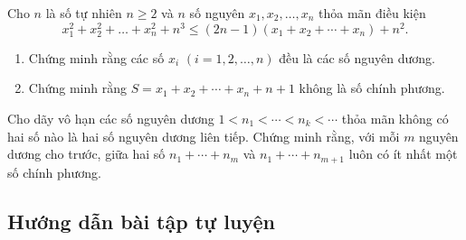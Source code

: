 \begin{btt}
Cho $n$ là số tự nhiên $n \geq 2$ và $n$ số nguyên $x_{1}, x_{2}, \ldots, x_{n}$ thỏa mãn điều kiện $$x_{1}^{2}+x_{2}^{2}+\ldots+x_{n}^{2}+n^{3} \leq(2 n-1)\left(x_{1}+x_{2}+\cdots+x_{n}\right)+n^{2} .$$
\begin{enumerate}[a,]
    \item Chứng minh rằng các số $x_{i}$ $(i=1,2,\ldots, {n})$ đều là các số nguyên dương.
    \item  Chứng minh rằng $S=x_{1}+x_{2}+\cdots+x_{n}+n+1$ không là số chính phương.
\end{enumerate}
\end{btt}

\begin{btt}
Cho dãy vô hạn các số nguyên dương $1<n_{1}<\cdots<n_{k}<\cdots$ thỏa mãn không có hai số nào là hai số nguyên dương liên tiếp. Chứng minh rằng, với mỗi $m$ nguyên dương cho trước, giữa hai số $n_{1}+\cdots+n_{m}$ và $n_{1}+\cdots+n_{m+1}$ luôn có ít nhất một số chính phương.
\end{btt}

\subsection*{Hướng dẫn bài tập tự luyện}

